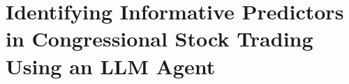 \documentclass[15pt,letterpaper]{article}
\begin{document}


\section{Identifying Informative Predictors in Congressional Stock Trading Using an LLM Agent}
\end{document}
